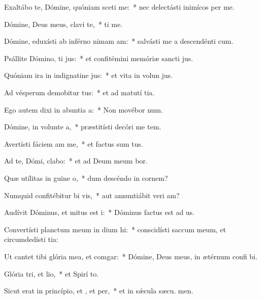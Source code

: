 \item Exaltábo te, Dómine, quóniam sceti me:~* nec delectásti inimícos  per me.
\item Dómine, Deus meus, clavi  te,~*  ti me.
\item Dómine, eduxísti ab inférno nimam am:~* salvásti me a descendénti  cum.
\item Psállite Dómino, ti jus:~* et confitémini memóriæ sancti jus.
\item Quóniam ira in indignatine jus:~* et vita in volun jus.
\item Ad vésperum demobitur tus:~* et ad matutí tia.
\item Ego autem dixi in abuntia a:~* Non movébor  num.
\item Dómine, in volunte a,~* præstitísti decóri me tem.
\item Avertísti fáciem am  me,~* et factus sum tus.
\item Ad te, Dómi, clabo:~* et ad Deum meum bor.
\item Quæ utílitas in guine o,~* dum descéndo in cornem?
\item Numquid confitébitur bi vis,~* aut annuntiábit veri am?
\item Audívit Dóminus, et mitus est i:~* Dóminus factus est ad us.
\item Convertísti planctum meum in dium hi:~* conscidísti saccum meum, et circumdedísti  tia:
\item Ut cantet tibi glória mea, et  comgar:~* Dómine, Deus meus, in ætérnum confi bi.
\item Glória tri, et lio,~* et Spirí to.
\item Sicut erat in princípio, et , et per,~* et in sǽcula sæcu. men.
